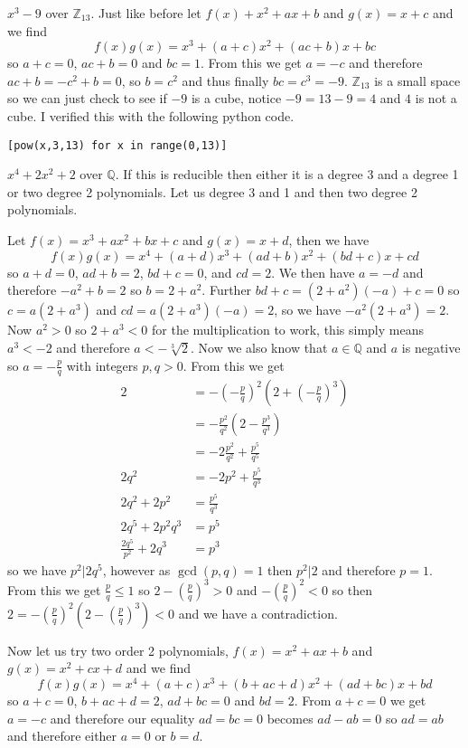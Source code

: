 \documentclass{article}
\begin{document}
 $x^3-9$ over $\mathbb Z_{13}$. Just like before let $f(x) + x^2+ax+b$ and $g(x) = x+c$ and we find $$f(x)g(x) = x^3+(a+c)x^2+(ac+b)x+bc$$ so $a+c = 0$, $ac+b=0$ and $bc=1$. From this we get $a=-c$ and therefore $ac+b = -c^2+b = 0$, so $b=c^2$ and thus finally $bc = c^3 = -9$. $\mathbb Z_{13}$ is a small space so we can just check to see if $-9$ is a cube, notice $-9=13-9=4$ and $4$ is not a cube. I verified this with the following python code.
\begin{center}
	\verb|[pow(x,3,13) for x in range(0,13)]|
\end{center}

 $x^4+2x^2+2$ over $\mathbb Q$. If this is reducible then either it is a degree 3 and a degree 1 or two degree 2 polynomials. Let us degree 3 and 1 and then two degree 2 polynomials.

Let $f(x) = x^3+ax^2+bx+c$ and $g(x) = x+d$, then we have $$f(x)g(x) = x^4+(a+d)x^3+(ad+b)x^2+(bd+c)x + cd$$ so $a+d = 0$, $ad+b=2$, $bd+c = 0$, and $cd = 2$. We then have $a=-d$ and therefore $-a^2+b=2$ so $b=2+a^2$. Further $bd+c = (2+a^2)(-a)+c = 0$ so $c = a(2+a^3)$ and $cd = a(2+a^3)(-a) = 2$, so we have $-a^2(2+a^3) = 2$. Now $a^2 > 0$ so $2+a^3 < 0$ for the multiplication to work, this simply means $a^3 <-2$ and therefore $a < -\sqrt[3]{2}$. Now we also know that $a\in\mathbb Q$ and $a$ is negative so $a = -\frac pq$ with integers $p,q > 0$. From this we get 
\begin{align*}2 &= -\left(-\frac pq\right)^2\left(2+\left(-\frac pq\right)^3\right)\\
&= -\frac{p^2}{q^2}\left(2-\frac{p^3}{q^3}\right)\\
&= -2\frac{p^2}{q^2}+\frac{p^5}{q^5}\\
2q^2 &= -2p^2+\frac{p^5}{q^3}\\
2q^2+2p^2&=\frac{p^5}{q^3}\\
2q^5+2p^2q^3 &= p^5\\
\frac{2q^5}{p^2}+2q^3 &= p^3
\end{align*}
so we have $p^2|2q^5$, however as $\gcd(p,q) = 1$ then $p^2|2$ and therefore $p=1$. From this we get $\frac pq\le 1$ so $2-\left(\frac pq\right)^3 > 0$ and $-\left(\frac pq\right)^2 < 0$ so then $2=-\left(\frac pq\right)^2\left(2-\left(\frac pq\right)^3\right) < 0$ and we have a contradiction.

Now let us try two order 2 polynomials, $f(x) = x^2+ax+b$ and $g(x) = x^2+cx+d$ and we find $$f(x)g(x) = x^4+(a+c)x^3+(b+ac+d)x^2+(ad+bc)x+bd$$ so $a+c = 0$, $b+ac+d = 2$, $ad+bc=0$ and $bd = 2$. From $a+c=0$ we get $a=-c$ and therefore our equality $ad=bc=0$ becomes $ad-ab=0$ so $ad=ab$ and therefore either $a=0$ or $b=d$.
\end{document}
